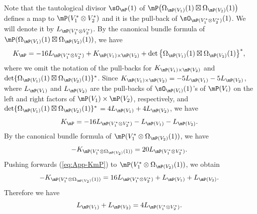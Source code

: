 \documentclass[pdftex]{sigma}
\numberwithin{equation}{section}
\begin{document}
Note that the tautological divisor $\sO_{\mP}(1)$ of $\mP\big(\Omega_{\mP(V_{1})}(1)\boxtimes\Omega_{\mP(V_{2})}(1)\big)$ defines a map to $\mP(V_{1}^{*}\otimes V_{2}^{*})$ and it is the pull-back of $\sO_{\mP(V_{1}^{*}\otimes V_{2}^{*})}(1)$. We will denote it by $L_{\mP(V_{1}^{*}\otimes V_{2}^{*})}$. By the canonical bundle formula of $\mP(\Omega_{\mP(V_{1})}(1)\boxtimes\Omega_{\mP(V_{2})}(1))$, we have
\begin{gather*}
K_{\mP}=-16L_{\mP(V_{1}^{*}\otimes V_{2}^{*})}+K_{\mP(V_{1})\times\mP(V_{2})}+\det\big\{\Omega_{\mP(V_{1})}(1)\boxtimes\Omega_{\mP(V_{2})}(1)\big\}^{*},
\end{gather*}
where we omit the notation of the pull-backs for $K_{\mP(V_{1})\times\mP(V_{2})}$ and $\det\{\Omega_{\mP(V_{1})}(1)\boxtimes\Omega_{\mP(V_{2})}(1)\}^{*}$. Since $K_{\mP(V_{1})\times\mP(V_{2})}=-5L_{\mP(V_{1})}-5L_{\mP(V_{2})}$, where $L_{\mP(V_{1})}$ and $L_{\mP(V_{2})}$ are the pull-backs of $\sO_{\mP(V_{i})}(1)$'s of $\mP(V_{i})$ on the left and right factors of $\mP(V_{1})\times\mP(V_{2})$, respectively, and $\det\{\Omega_{\mP(V_{1})}(1)\boxtimes\Omega_{\mP(V_{2})}(1)\}^{*}$ $=4L_{\mP(V_{1})}+4L_{\mP(V_{2})}$, we have
\begin{gather}
K_{\mP}=-16L_{\mP(V_{1}^{*}\otimes V_{2}^{*})}-L_{\mP(V_{1})}-L_{\mP(V_{2})}.\label{eq:App-KmP}
\end{gather}
By the canonical bundle formula of $\mP(V_{1}^{*}\otimes\Omega_{\mP(V_{2})}(1))$, we have
\begin{gather*}
-K_{\mP(V_{1}^{*}\otimes\Omega_{\mP(V_{2})}(1))}=20L_{\mP(V_{1}^{*}\otimes V_{2}^{*})}.
\end{gather*}
Pushing forwards (\ref{eq:App-KmP}) to $\mP(V_{1}^{*}\otimes\Omega_{\mP(V_{2})}(1))$, we obtain
\begin{gather*}
-K_{\mP(V_{1}^{*}\otimes\Omega_{\mP(V_{2})}(1))}=16L_{\mP(V_{1}^{*}\otimes V_{2}^{*})}+L_{\mP(V_{1})}+L_{\mP(V_{2})}.
\end{gather*}
Therefore we have
\begin{gather}
L_{\mP(V_{1})}+L_{\mP(V_{2})}=4L_{\mP(V_{1}^{*}\otimes V_{2}^{*})}.\label{eq:new706}
\end{gather}
\end{document}
